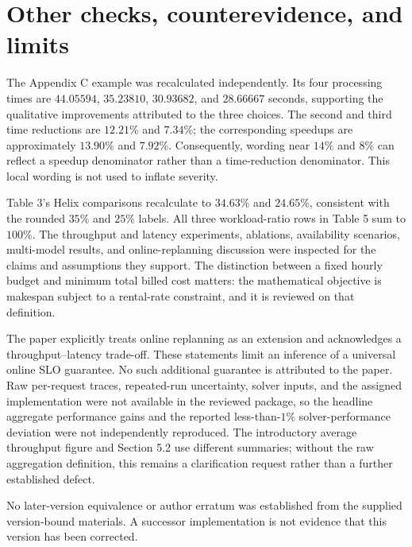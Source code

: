 \documentclass[10pt]{article}
\begin{document}
\section*{Other checks, counterevidence, and limits}
The Appendix C example was recalculated independently. Its four processing times are \(44.05594\), \(35.23810\), \(30.93682\), and \(28.66667\) seconds, supporting the qualitative improvements attributed to the three choices. The second and third time reductions are \(12.21\%\) and \(7.34\%\); the corresponding speedups are approximately \(13.90\%\) and \(7.92\%\). Consequently, wording near \(14\%\) and \(8\%\) can reflect a speedup denominator rather than a time-reduction denominator. This local wording is not used to inflate severity.\par
Table 3’s Helix comparisons recalculate to \(34.63\%\) and \(24.65\%\), consistent with the rounded \(35\%\) and \(25\%\) labels. All three workload-ratio rows in Table 5 sum to \(100\%\). The throughput and latency experiments, ablations, availability scenarios, multi-model results, and online-replanning discussion were inspected for the claims and assumptions they support. The distinction between a fixed hourly budget and minimum total billed cost matters: the mathematical objective is makespan subject to a rental-rate constraint, and it is reviewed on that definition.\par
The paper explicitly treats online replanning as an extension and acknowledges a throughput–latency trade-off. These statements limit an inference of a universal online SLO guarantee. No such additional guarantee is attributed to the paper. Raw per-request traces, repeated-run uncertainty, solver inputs, and the assigned implementation were not available in the reviewed package, so the headline aggregate performance gains and the reported less-than-\(1\%\) solver-performance deviation were not independently reproduced. The introductory average throughput figure and Section 5.2 use different summaries; without the raw aggregation definition, this remains a clarification request rather than a further established defect.\par
No later-version equivalence or author erratum was established from the supplied version-bound materials. A successor implementation is not evidence that this version has been corrected.\par
\end{document}
